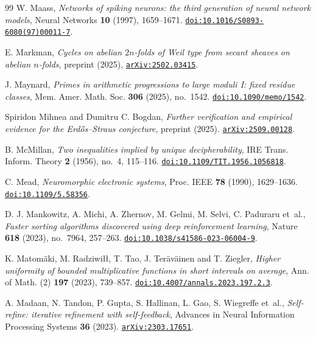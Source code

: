 \begin{thebibliography}{99}
W. Maass,
\emph{Networks of spiking neurons: the third generation of neural network models},
Neural Networks \textbf{10} (1997), 1659--1671.
\href{https://doi.org/10.1016/S0893-6080(97)00011-7}{\nolinkurl{doi:10.1016/S0893-6080(97)00011-7}}.

E. Markman,
\emph{Cycles on abelian $2n$-folds of Weil type from secant sheaves on abelian $n$-folds},
preprint (2025), \href{https://arxiv.org/abs/2502.03415}{\nolinkurl{arXiv:2502.03415}}.

J. Maynard,
\emph{Primes in arithmetic progressions to large moduli I: fixed residue classes},
Mem. Amer. Math. Soc. \textbf{306} (2025), no.~1542.
\href{https://doi.org/10.1090/memo/1542}{\nolinkurl{doi:10.1090/memo/1542}}.

Spiridon Mihnea and Dumitru C. Bogdan,
\emph{Further verification and empirical evidence for the Erd\H{o}s--Straus conjecture},
preprint (2025).
\href{https://arxiv.org/abs/2509.00128}{\nolinkurl{arXiv:2509.00128}}.

B. McMillan,
\emph{Two inequalities implied by unique decipherability},
IRE Trans. Inform. Theory \textbf{2} (1956), no.~4, 115--116.
\href{https://doi.org/10.1109/TIT.1956.1056818}{\nolinkurl{doi:10.1109/TIT.1956.1056818}}.

C. Mead,
\emph{Neuromorphic electronic systems},
Proc. IEEE \textbf{78} (1990), 1629--1636.
\href{https://doi.org/10.1109/5.58356}{\nolinkurl{doi:10.1109/5.58356}}.

D. J. Mankowitz, A. Michi, A. Zhernov, M. Gelmi, M. Selvi, C. Paduraru et~al.,
\emph{Faster sorting algorithms discovered using deep reinforcement learning},
Nature \textbf{618} (2023), no.~7964, 257--263.
\href{https://doi.org/10.1038/s41586-023-06004-9}{\nolinkurl{doi:10.1038/s41586-023-06004-9}}.

K. Matom\"aki, M. Radziwi\l\l, T. Tao, J. Ter\"av\"ainen and T. Ziegler,
\emph{Higher uniformity of bounded multiplicative functions in short intervals on average},
Ann. of Math. (2) \textbf{197} (2023), 739--857.
\href{https://doi.org/10.4007/annals.2023.197.2.3}{\nolinkurl{doi:10.4007/annals.2023.197.2.3}}.

A. Madaan, N. Tandon, P. Gupta, S. Hallinan, L. Gao, S. Wiegreffe et~al.,
\emph{Self-refine: iterative refinement with self-feedback},
Advances in Neural Information Processing Systems \textbf{36} (2023).
\href{https://arxiv.org/abs/2303.17651}{\nolinkurl{arXiv:2303.17651}}.


\end{thebibliography}

